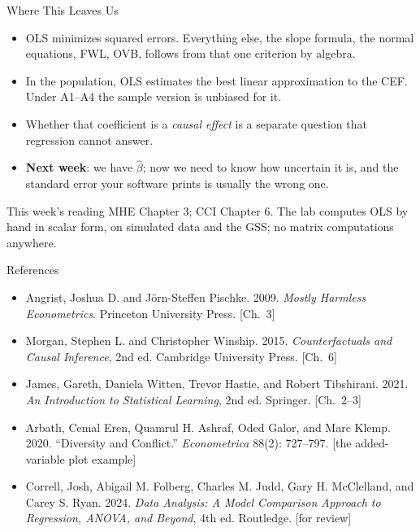 \documentclass[aspectratio=169,11pt,xcolor=dvipsnames]{beamer}
\begin{document}
\begin{frame}{Where This Leaves Us}
\begin{itemize}\itemsep5pt
  \item OLS minimizes squared errors. Everything else, the slope formula, the
        normal equations, FWL, OVB, follows from that one criterion by algebra.
  \item In the population, OLS estimates the best linear approximation to the CEF.
        Under A1--A4 the sample version is unbiased for it.
  \item Whether that coefficient is a \emph{causal effect} is a separate question
        that regression cannot answer.
  \item \textbf{Next week}: we have $\hat\beta$; now we need to know how uncertain
        it is, and the standard error your software prints is usually the wrong
        one.
\end{itemize}
\vskip6pt
\begin{block}{This week's reading}
MHE Chapter 3; CCI Chapter 6. The lab computes OLS by hand in scalar form,
on simulated data and the GSS; no matrix computations anywhere.
\end{block}
\end{frame}

\begin{frame}[allowframebreaks,t]{References}
\footnotesize
\begin{itemize}\itemsep3pt
\item Angrist, Joshua D. and J\"orn-Steffen Pischke. 2009.
\textit{Mostly Harmless Econometrics}. Princeton University Press. [Ch.\ 3]
\item Morgan, Stephen L. and Christopher Winship. 2015.
\textit{Counterfactuals and Causal Inference}, 2nd ed. Cambridge University Press.
[Ch.\ 6]
\item James, Gareth, Daniela Witten, Trevor Hastie, and Robert Tibshirani. 2021.
\textit{An Introduction to Statistical Learning}, 2nd ed. Springer. [Ch.\ 2--3]
\item Arbatl{\i}, Cemal Eren, Quamrul H. Ashraf, Oded Galor, and Marc Klemp.
2020. ``Diversity and Conflict.'' \textit{Econometrica} 88(2): 727--797.
[the added-variable plot example]
\item Correll, Josh, Abigail M. Folberg, Charles M. Judd, Gary H. McClelland, and
Carey S. Ryan. 2024. \textit{Data Analysis: A Model Comparison Approach to
Regression, ANOVA, and Beyond}, 4th ed. Routledge. [for review]
\end{itemize}
\end{frame}
\end{document}
